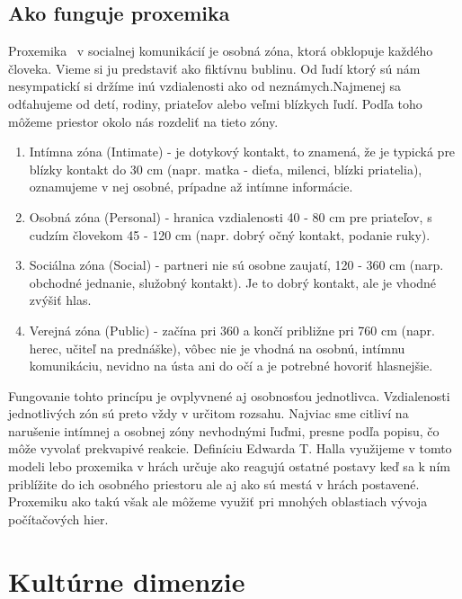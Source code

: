 \documentclass[10pt,twoside,slovak,a4paper]{article}
\begin{document}
\subsection{Ako funguje proxemika}\label{proxemika:funkcnost}

Proxemika~\cite{proxemika} v socialnej komunikácií je osobná zóna, ktorá obklopuje každého človeka. Vieme si ju
predstaviť ako fiktívnu bublinu. Od ľudí ktorý sú nám nesympatickí si držíme inú vzdialenosti ako
od neznámych.Najmenej sa odťahujeme od detí, rodiny, priateľov alebo veľmi blízkych ľudí. Podľa
toho môžeme priestor okolo nás rozdeliť na tieto zóny.

\begin{enumerate}
	\item Intímna zóna (Intimate) - je dotykový kontakt, to znamená, že je typická pre blízky kontakt do 30 cm (napr. matka - dieťa, milenci, blízki priatelia), oznamujeme v nej osobné, prípadne až intímne informácie.
	\item Osobná zóna (Personal) - hranica vzdialenosti 40 - 80 cm pre priateľov, s cudzím človekom 45 - 120 cm (napr. dobrý očný kontakt,  podanie ruky).
	\item Sociálna zóna (Social) - partneri nie sú osobne zaujatí, 120 - 360 cm (narp. obchodné jednanie, služobný kontakt). Je to dobrý kontakt, ale je vhodné zvýšiť hlas.
	\item Verejná zóna (Public) - začína pri 360 a končí približne pri 760 cm (napr. herec, učiteľ na prednáške), vôbec nie je vhodná na osobnú, intímnu komunikáciu, nevidno na ústa ani do očí a je potrebné hovoriť hlasnejšie.
\end{enumerate}

Fungovanie tohto princípu je ovplyvnené aj osobnosťou jednotlivca. Vzdialenosti jednotlivých
zón sú preto vždy v určitom rozsahu. Najviac sme citliví na narušenie intímnej a osobnej zóny
nevhodnými ľuďmi, presne podľa popisu, čo môže vyvolať prekvapivé reakcie.
Definíciu Edwarda T. Halla využijeme v tomto modeli lebo proxemika v hrách určuje ako reagujú
ostatné postavy keď sa k ním priblížite do ich osobného priestoru ale aj ako sú mestá v hrách
postavené. Proxemiku ako takú však ale môžeme využiť pri mnohých oblastiach vývoja počítačových
hier.

\section{Kultúrne dimenzie}\label{kultura} 
\end{document}
